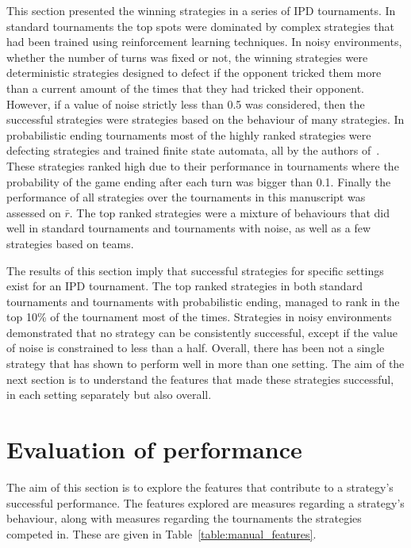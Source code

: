 \documentclass{article}
\newcommand{\numberofalltournaments}{}
\newcommand{\numberofstrategies}{}
\begin{document}
This section presented the winning strategies in a series of IPD tournaments. In
standard tournaments the top spots were dominated by complex strategies that had
been trained using reinforcement learning techniques. In noisy environments,
whether the number of turns was fixed or not, the winning strategies were
deterministic strategies designed to defect if the opponent tricked them more
than a current amount of the times that they had tricked their opponent. However,
if a value of noise strictly less than 0.5 was considered, then the successful
strategies were strategies based on the behaviour of many strategies. In
probabilistic ending tournaments most of the highly ranked strategies were defecting
strategies and trained finite state automata, all by the authors of~\cite{Ashlock2006, Ashlock2014}.
These strategies ranked high due to their performance in tournaments where the probability of the game ending after
each turn was bigger than 0.1.
Finally the performance of all \numberofstrategies
strategies over the \numberofalltournaments tournaments in this manuscript was
assessed on \(\bar{r}\). The top ranked strategies were a mixture of behaviours
that did well in standard tournaments and tournaments with noise, as well as a
few strategies based on teams.

The results of this section imply that successful strategies for specific
settings exist for an IPD tournament. The top ranked strategies in both standard
tournaments and tournaments with probabilistic ending, managed to rank in the
top 10\% of the tournament most of the times.
Strategies in noisy
environments demonstrated that no strategy can be consistently
successful, except if the value of noise is constrained to less than a half.
Overall, there has been not a single strategy that has shown to perform well in
more than one setting. The aim of the next section is to understand the features
that made these strategies successful, in each setting separately
but also overall.

\section{Evaluation of performance}\label{section:evaluation_of_performance}

The aim of this section is to explore the features that contribute to a
strategy's successful performance. The features explored are measures regarding a
strategy's behaviour, along with measures regarding the tournaments the
strategies competed in. These are given in Table~\ref{table:manual_features}.
\end{document}
